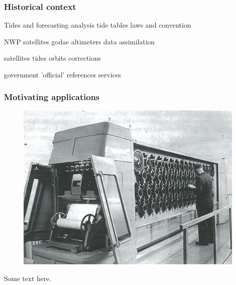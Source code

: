 \begin{frame}
\frametitle{Historical context}

Tides and forecasting
analysis 
tide tables
laws and convention


NWP
satellites
godae
altimeters
data assimilation


satellites
tides 
orbits
corrections


government
'official'
references
services

\end{frame}
\begin{frame}
\frametitle{Motivating applications}
\begin{minipage}{0.45\textwidth}
    \begin{figure}      
    \includegraphics[width=\textwidth]{figures/images/DHI_machine_cartwright_fig11p2.png}
    \end{figure}
\end{minipage}
\hfill
\begin{minipage}{0.45\textwidth}
    Some text here.
\end{minipage}
\end{frame}
